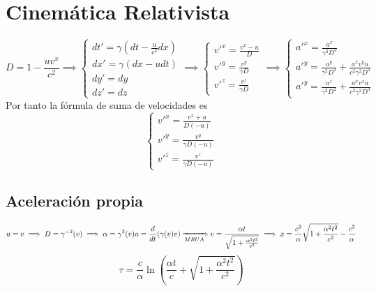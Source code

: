 \documentclass[leqno]{article}
\newcommand{\1}{\tikz[baseline=(char.base)]{
            \node[shape=circle,draw,inner sep=1pt] (char) {1};}}
\newcommand{\2}{\tikz[baseline=(char.base)]{
            \node[shape=circle,draw,inner sep=1pt] (char) {2};}}
\newcommand{\g}{\gamma}
\begin{document}
\section{Cinemática Relativista}
 $$ D = 1-\dfrac{uv^x}{c^2} \implies 
\begin{cases}
dt'=\g (dt-\frac{u}{c^2}dx) \\
dx' = \g (dx-udt) \\
dy' = dy\\
dz' = dz
\end{cases}
\implies 
\begin{cases}
v'^x = \frac{v^x - u}{D} \\
v'^y =  \frac{v^y}{\g D}\\
v'^z =  \frac{v^z}{\g D}
\end{cases}
\implies 
\begin{cases}
a'^x = \frac{a^x}{\g^3D^3} \\
a'^y =  \frac{a^y}{\g^2 D^2} + \frac{a^xv^yu}{c^2\g^2D^3}\\
a'^y =  \frac{a^z}{\g^2 D^2} + \frac{a^xv^zu}{c^2\g^2D^3}
\end{cases}
$$
Por tanto la fórmula de suma de velocidades es
$$
\begin{cases}
v'^x = \frac{v^x + u}{D(-u)} \\
v'^y =  \frac{v^y}{\g D(-u)}\\
v'^z =  \frac{v^z}{\g D(-u)}
\end{cases}
$$

\subsection{Aceleración propia}
$$
u=v \implies D=\g^{-2}(v) \implies \alpha = \g^3(v)a=\dfrac{d}{dt}(\g (v)v) \xRightarrow[MRUA]{} v = \frac{\alpha t}{\sqrt{1+\frac{\alpha^2t^2}{c^2}}} \implies x = \frac{c^2}{\alpha}\sqrt{1+\frac{\alpha^2t^2}{c^2}} - \frac{c^2}{\alpha}
$$
$$
{\tau ={\frac {c}{\alpha}}\ln \left({\frac {\alpha t}{c}}+{\sqrt {1+{\frac {\alpha^{2}t^{2}}{c^{2}}}}}\right)}
$$
\end{document}
